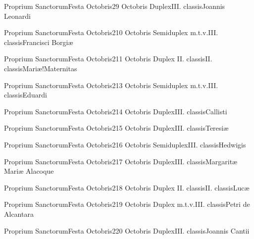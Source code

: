 \documentclass[liber-responsorialis_sanctorale.tex]{subfiles}
\begin{document}
	{Proprium Sanctorum}{Festa Octobris}{2}{9 Octobris}
	{Duplex}{III. classis}{Joannis Leonardi}
	{\conprubric}
	{\respdetemp}

	{Proprium Sanctorum}{Festa Octobris}{2}{10 Octobris}
	{Semiduplex m.t.v.}{III. classis}{Francisci Borgiæ}
	{\conprubric}
	{\respdetemp}

	{Proprium Sanctorum}{Festa Octobris}{2}{11 Octobris}
	{Duplex II. classis}{II. classis}{Mariæ!Maternitas}
	{}
	{}

	{Proprium Sanctorum}{Festa Octobris}{2}{13 Octobris}
	{Semiduplex m.t.v.}{III. classis}{Eduardi}
	{\conprubric}
	{\respdetemp}

	{Proprium Sanctorum}{Festa Octobris}{2}{14 Octobris}
	{Duplex}{III. classis}{Callisti}
	{\umexrubric}
	{\respdetemp}

	{Proprium Sanctorum}{Festa Octobris}{2}{15 Octobris}
	{Duplex}{III. classis}{Teresiæ}
	{\vnrubric}
	{\respdetemp}

	{Proprium Sanctorum}{Festa Octobris}{2}{16 Octobris}
	{Semiduplex}{III. classis}{Hedwigis}
	{\nnrubric}
	{\respdetemp}

	{Proprium Sanctorum}{Festa Octobris}{2}{17 Octobris}
	{Duplex}{III. classis}{Margaritæ Mariæ Alacoque}
	{\vnrubric}
	{\respdetemp}

	{Proprium Sanctorum}{Festa Octobris}{2}{18 Octobris}
	{Duplex II. classis}{II. classis}{Lucæ}
	{}
	{}
\rubric{\apexrubric}

	{Proprium Sanctorum}{Festa Octobris}{2}{19 Octobris}
	{Duplex m.t.v.}{III. classis}{Petri de Alcantara}
	{\conprubric}
	{\respdetemp}

	{Proprium Sanctorum}{Festa Octobris}{2}{20 Octobris}
	{Duplex}{III. classis}{Joannis Cantii}
	{\conprubric}
	{\respdetemp}
\end{document}
